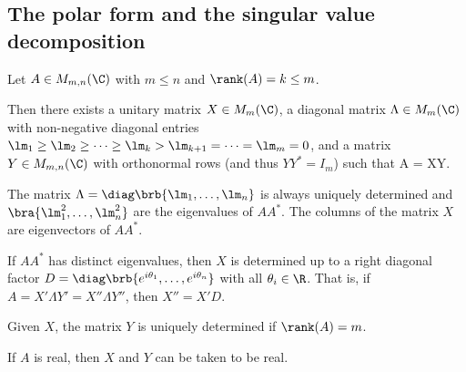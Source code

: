 \subsection{The polar form and the singular value decomposition}

\begin{lemma}\label{lem:any_matrix_product_of_unitary_diagonal_orthonormal}
Let $A\in M_{m,n}(\C)$ with $m\leq n$ and $\rank (A) = k\leq m$.

Then there exists a unitary matrix $X\in M_m(\C)$, a diagonal matrix $\Lambda \in M_m(\C)$ with non-negative diagonal entries $\lm_1 \geq \lm_2 \geq \dots \geq \lm_k > \lm_{k+1} = \dots = \lm_m =
0$, and a matrix $Y\in M_{m,n}(\C)$ with orthonormal rows (and thus $YY^* = I_m$) such that
\be
A = X\Lambda Y.
\ee

The matrix $\Lambda = \diag\brb{\lm_1,\dots,\lm_n}$ is always uniquely determined and $\bra{\lm_1^2,\dots,\lm_n^2}$ are the eigenvalues of $AA^*$. The columns of the matrix $X$ are eigenvectors of
$AA^*$.

If $AA^*$ has distinct eigenvalues, then $X$ is determined up to a right diagonal factor $D = \diag\brb{e^{i\theta_1},\dots,e^{i\theta_n}}$ with all $\theta_i\in \R$. That is, if $A = X'\Lambda Y' =
X''\Lambda Y''$, then $X'' = X'D$.

Given $X$, the matrix $Y$ is uniquely determined if $\rank(A) = m$.

If $A$ is real, then $X$ and $Y$ can be taken to be real.
\end{lemma}

